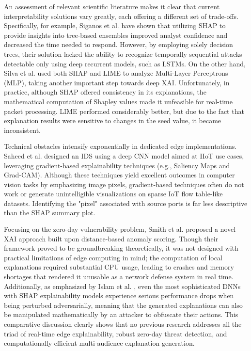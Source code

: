 \documentclass[12pt]{article}
\begin{document}
An assessment of relevant scientific literature makes it clear that current interpretability solutions vary greatly, each offering a different set of trade-offs. Specifically, for example, Siganos et al. \cite{siganos2023explainable} have shown that utilizing SHAP to provide insights into tree-based ensembles improved analyst confidence and decreased the time needed to respond. However, by employing solely decision trees, their solution lacked the ability to recognize temporally sequential attacks detectable only using deep recurrent models, such as LSTMs. On the other hand, Silva et al. \cite{ieee2024limeshap} used both SHAP and LIME to analyze Multi-Layer Perceptrons (MLP), taking another important step towards deep XAI. Unfortunately, in practice, although SHAP offered consistency in its explanations, the mathematical computation of Shapley values made it unfeasible for real-time packet processing. LIME performed considerably better, but due to the fact that explanation results were sensitive to changes in the seed value, it became inconsistent.

    Technical obstacles intensify exponentially in dedicated edge implementations. Saheed et al. \cite{saheed2022explainable} designed an IDS using a deep CNN model aimed at IIoT use cases, leveraging gradient-based explainability techniques (e.g., Saliency Maps and Grad-CAM). Although these techniques yield excellent outcomes in computer vision tasks by emphasizing image pixels, gradient-based techniques often do not work or generate unintelligible visualizations on sparse IoT flow table-like datasets. Identifying the "pixel" associated with source ports is far less descriptive than the SHAP summary plot.

Focusing on the zero-day vulnerability problem, Smith et al. \cite{aspg2025zeroday} proposed a novel XAI approach built upon distance-based anomaly scoring. Though their framework proved to be groundbreaking theoretically, it was not designed with practical limitations of edge computing in mind; the computation of local explanations required substantial CPU usage, leading to crashes and memory shortages that rendered it unusable as a network defense system in real time. Additionally, as emphasized by Islam et al. \cite{islam2023robust}, even the most sophisticated DNNs with SHAP explainability models experience serious performance drops when being perturbed adversarially, meaning that the generated explanations can also be manipulated mathematically by an attacker to obfuscate their actions. This comparative discussion clearly shows that no previous research addresses all the triad of real-time edge explainability, robust zero-day threat detection, and computationally efficient multi-audience explanation generation.
\end{document}
